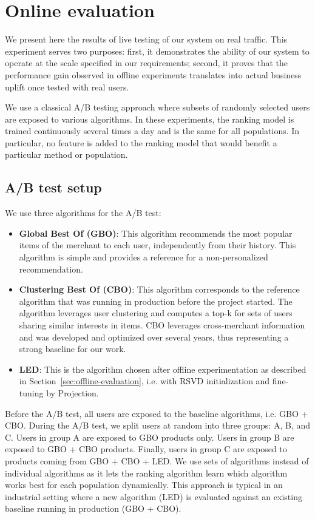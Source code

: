 \documentclass[sigconf]{acmart}
\begin{document}
\section{Online evaluation}
\label{sec:online-results}

We present here the results of live testing of our system on real traffic. This experiment serves two purposes: first, it demonstrates the ability of our system to operate at the scale specified in our requirements; second, it proves that the performance gain observed in offline experiments translates into actual business uplift once tested with real users.

We use a classical A/B testing approach where subsets of randomly selected users are exposed to various algorithms. In these experiments, the ranking model is trained continuously several times a day and is the same for all populations. In particular, no feature is added to the ranking model that would benefit a particular method or population.


\subsection{A/B test setup}
\label{sec:ab-test-setup}
We use three algorithms for the A/B test:
\begin{itemize}
    \item \textbf{Global Best Of (GBO)}: This algorithm recommends the most popular items of the merchant to each user, independently from their history. This algorithm is simple and provides a reference for a non-personalized recommendation.
    
    \item \textbf{Clustering Best Of (CBO)}: This algorithm corresponds to the reference algorithm that was running in production before the project started. The algorithm leverages user clustering and computes a top-k for sets of users sharing similar interests in items. CBO leverages cross-merchant information and was developed and optimized over several years, thus representing a strong baseline for our work.
    
    \item \textbf{LED}: This is the algorithm chosen after offline experimentation as described in Section~\ref{sec:offline-evaluation}, i.e. with RSVD initialization and fine-tuning by Projection.
\end{itemize}

Before the A/B test, all users are exposed to the baseline algorithms, i.e. GBO + CBO. During the A/B test, we split users at random into three groups: A, B, and C. Users in group A are exposed to GBO products only. Users in group B are  exposed to GBO + CBO products. Finally, users in group C are exposed to products coming from GBO + CBO + LED. We use sets of algorithms instead of individual algorithms as it lets the ranking algorithm learn which algorithm works best for each population dynamically. This approach is typical in an industrial setting where a new algorithm (LED) is evaluated against an existing baseline running in production (GBO + CBO).
\end{document}
